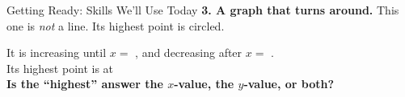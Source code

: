 \documentclass[12pt]{article}
\newcommand{\lgrid}[4]{%
  \draw[step=1, linegray!40, very thin] (#1,#3) grid (#2,#4);
  \draw[->, semithick, charcoal] (#1,0)--(#2,0) node[below right, font=\scriptsize]{$x$};
  \draw[->, semithick, charcoal] (0,#3)--(0,#4) node[left, font=\scriptsize]{$y$};}
\newcommand{\fdot}[3]{\fill[#1] (#2,#3) circle (3.2pt);}
\begin{document}
\begin{notesbox}{Getting Ready: Skills We'll Use Today}
\vspace{6pt}
\textbf{3. A graph that turns around.} This one is \emph{not} a line. Its highest point is
circled.
\begin{minipage}[c]{0.60\linewidth}
  It is increasing until $x=$ , and decreasing after $x=$ . \\[5pt]
  Its highest point is at  \\[5pt]
  \textbf{Is the ``highest'' answer the $x$-value, the $y$-value, or both?} \\[3pt]
\end{minipage}\hfill
\begin{minipage}[c]{0.36\linewidth}\centering
{}
\end{minipage}
\end{notesbox}
\end{document}
